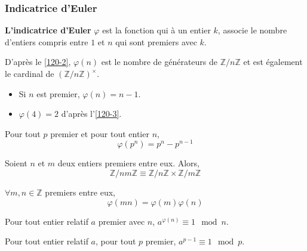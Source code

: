 	\subsubsection{Indicatrice d'Euler}


	\begin{definition}
		\textbf{L'indicatrice d'Euler} $\varphi$ est la fonction qui à un entier $k$, associe le nombre d'entiers compris entre $1$ et $n$ qui sont premiers avec $k$.
	\end{definition}

	\begin{remark}
		D'après le \cref{120-2}, $\varphi(n)$ est le nombre de générateurs de $\mathbb{Z}/n\mathbb{Z}$ et est également le cardinal de $(\mathbb{Z}/n\mathbb{Z})^\times$.
	\end{remark}

	\begin{example}
		\begin{itemize}
			\item Si $n$ est premier, $\varphi(n) = n-1$.
			\item $\varphi(4) = 2$ d'après l'\cref{120-3}.
		\end{itemize}
	\end{example}


	\begin{proposition}
		Pour tout $p$ premier et pour tout entier $n$,
		\[ \varphi(p^n) = p^n - p^{n-1} \]
	\end{proposition}

	\begin{theorem}[Chinois]
		\label{120-4}
		Soient $n$ et $m$ deux entiers premiers entre eux. Alors,
		\[ \mathbb{Z}/nm\mathbb{Z} \equiv \mathbb{Z}/n\mathbb{Z} \times \mathbb{Z}/m\mathbb{Z} \]
	\end{theorem}

	\begin{corollary}
		$\forall m, n \in \mathbb{Z}$ premiers entre eux,
		\[ \varphi(mn) = \varphi(m)\varphi(n) \]
	\end{corollary}

	\begin{proposition}
		Pour tout entier relatif $a$ premier avec $n$, $a^{\varphi(n)} \equiv 1 \mod n$.
	\end{proposition}

	\begin{proposition}
		Pour tout entier relatif $a$, pour tout $p$ premier, $a^{p-1} \equiv 1 \mod p$.
	\end{proposition}

